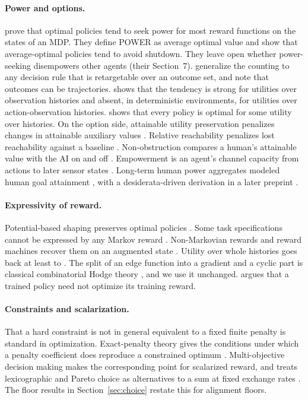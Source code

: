\documentclass[11pt]{article}
\begin{document}
\paragraph{Power and options.}
\textcite{turner2021seekpower} prove that optimal policies tend to seek power for most reward functions on the states of an MDP.
They define POWER as average optimal value and show that average-optimal policies tend to avoid shutdown.
They leave open whether power-seeking disempowers other agents (their Section~7).
\textcite{turner2022retargetable} generalize the counting to any decision rule that is retargetable over an outcome set, and note that outcomes can be trajectories.
\textcite{turner2021aoh} shows that the tendency is strong for utilities over observation histories and absent, in deterministic environments, for utilities over action-observation histories.
\textcite{shah2018coherence} shows that every policy is optimal for some utility over histories.
On the option side, attainable utility preservation penalizes changes in attainable auxiliary values \parencite{turner2019aup}.
Relative reachability penalizes lost reachability against a baseline \parencite{krakovna2018relative}.
Non-obstruction compares a human's attainable value with the AI on and off \parencite{turner2020nonobstruction}.
Empowerment is an agent's channel capacity from actions to later sensor states \parencite{klyubin2005empowerment}.
Long-term human power aggregates modeled human goal attainment \parencite{heitzig2025humanpower}, with a desiderata-driven derivation in a later preprint \parencite{heitzig2026fairpower}.

\paragraph{Expressivity of reward.}
Potential-based shaping preserves optimal policies \parencite{ng1999shaping}.
Some task specifications cannot be expressed by any Markov reward \parencite{abel2021expressivity}.
Non-Markovian rewards and reward machines recover them on an augmented state \parencite{bacchus1996rewarding,toroicarte2018rewardmachines}.
Utility over whole histories goes back at least to \textcite{hammond1988consequentialist}.
The split of an edge function into a gradient and a cyclic part is classical combinatorial Hodge theory \parencite{jiang2011hodgerank,lim2020hodge}, and we use it unchanged.
\textcite{turner2022rewardnotopt} argues that a trained policy need not optimize its training reward.

\paragraph{Constraints and scalarization.}
That a hard constraint is not in general equivalent to a fixed finite penalty is standard in optimization.
Exact-penalty theory gives the conditions under which a penalty coefficient does reproduce a constrained optimum \parencite{han1979exact}.
Multi-objective decision making makes the corresponding point for scalarized reward, and treats lexicographic and Pareto choice as alternatives to a sum at fixed exchange rates \parencite{roijers2013multiobjective}.
The floor results in Section~\ref{sec:choice} restate this for alignment floors.
\end{document}
